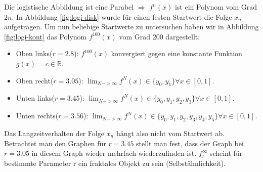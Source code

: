\documentclass[12pt,a4paper]{article}
\begin{document}
Die logistische Abbildung ist eine Parabel $\Rightarrow$ $f^n(x)$ ist ein Polynom vom Grad $2n$. 
In Abbildung \ref{fig:logi-disk} wurde für einen festen Startwert die Folge $x_n$ aufgetragen. Um nun  beliebige Startwerte zu untersuchen haben wir in Abbildung \ref{fig:logi-kont} das Polynom $f^{100}(x)$ vom Grad 200 dargestellt: 
\begin{itemize}
\item Oben links($r=2.8$): $f^{100}(x)$ konvergiert gegen eine konstante Funktion $g(x)=c \in \mathbb{R}$.
\item Oben recht($r=3.05$): $\lim_{N->\infty} f^N(x) \in \{y_0, y_1\} \forall x \in [0,1]$.
\item Unten links($r=3.45$): $\lim_{N->\infty} f^N(x) \in \{y_0, y_1, y_2, y_3\} \forall x \in [0,1]$.
\item Unten rechts($r=3.56$): $\lim_{N->\infty} f^N(x) \in \{y_0, y_1, y_2, y_3, y_4, y_5\} \forall x \in [0,1]$.
\end{itemize}
Das Langzeitverhalten der Folge $x_n$ hängt also nicht vom Startwert ab. 
Betrachtet man den Graphen für $r=3.45$ stellt man fest, dass der Graph bei $r=3.05$ in diesem Graph wieder mehrfach wiederzufinden ist. $f_r^{\infty}$ scheint für bestimmte Parameter r ein fraktales Objekt zu sein (Selbstähnlichkeit). 
\end{document}
